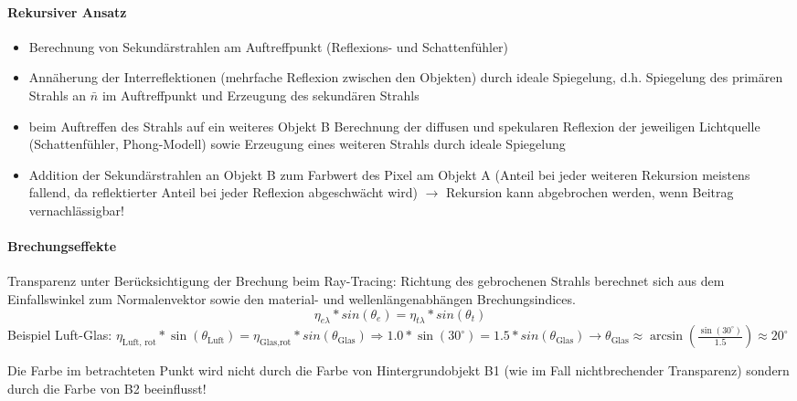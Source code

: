 \documentclass[10pt,landscape]{article}
\begin{document}
\begin{multicols}{3}
\paragraph{Rekursiver Ansatz}
\begin{itemize}
  \item Berechnung von Sekundärstrahlen am Auftreffpunkt (Reflexions- und Schattenfühler)
  \item Annäherung der Interreflektionen (mehrfache Reflexion zwischen den Objekten) durch ideale Spiegelung, d.h. Spiegelung des primären Strahls an $\bar{n}$ im Auftreffpunkt und Erzeugung des sekundären Strahls
  \item beim Auftreffen des Strahls auf ein weiteres Objekt B Berechnung der diffusen und spekularen Reflexion der jeweiligen Lichtquelle (Schattenfühler, Phong-Modell) sowie Erzeugung eines weiteren Strahls durch ideale Spiegelung
  \item Addition der Sekundärstrahlen an Objekt B zum Farbwert des Pixel am Objekt A (Anteil bei jeder weiteren Rekursion meistens fallend, da reflektierter Anteil bei jeder Reflexion abgeschwächt wird) $\rightarrow$ Rekursion kann abgebrochen werden, wenn Beitrag vernachlässigbar!
\end{itemize}


\paragraph{Brechungseffekte}
Transparenz unter Berücksichtigung der Brechung beim Ray-Tracing: Richtung des gebrochenen Strahls berechnet sich aus dem Einfallswinkel zum Normalenvektor sowie den material- und wellenlängenabhängen Brechungsindices.
$$\eta_{e\lambda}*sin(\theta_e) = \eta_{t\lambda}*sin(\theta_t)$$
Beispiel Luft-Glas: $\eta_{\text{Luft, rot}}*\sin(\theta_{\text{Luft}})=\eta_{\text{Glas,rot}}*sin(\theta_{\text{Glas}}) \Rightarrow 1.0*\sin(30^\circ)=1.5*sin(\theta_{\text{Glas}})\rightarrow \theta_{\text{Glas}} \approx \arcsin(\frac{\sin(30^\circ)}{1.5})\approx 20^\circ$

Die Farbe im betrachteten Punkt wird nicht durch die Farbe von Hintergrundobjekt B1 (wie im Fall nichtbrechender Transparenz) sondern durch die Farbe von B2 beeinflusst!


\end{multicols}
\end{document}
